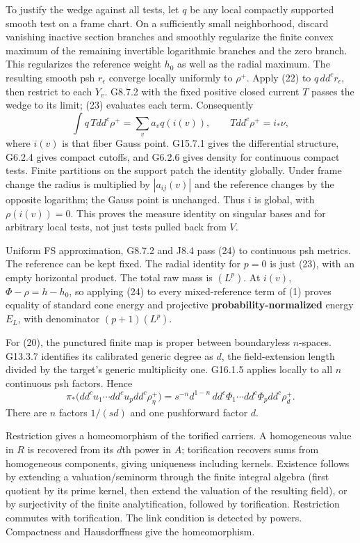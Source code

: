 \documentclass[
  10pt,
]{article}
\begin{document}
To justify the wedge against all tests, let \(q\) be any local compactly
supported smooth test on a frame chart. On a sufficiently small
neighborhood, discard vanishing inactive section branches and smoothly
regularize the finite convex maximum of the remaining invertible
logarithmic branches and the zero branch. This regularizes the reference
weight \(h_0\) as well as the radial maximum. The resulting smooth psh
\(r_\epsilon\) converge locally uniformly to \(\rho^+\). Apply (22) to
\(q\,dd^cr_\epsilon\), then restrict to each \(Y_v\). G8.7.2 with the
fixed positive closed current \(T\) passes the wedge to its limit; (23)
evaluates each term. Consequently
\[ \int q\,Tdd^c\rho^+=\sum_v a_vq(i(v)),\qquad Tdd^c\rho^+=i_*\nu,                            \tag{24}\]
where \(i(v)\) is that fiber Gauss point. G15.7.1 gives the differential
structure, G6.2.4 gives compact cutoffs, and G6.2.6 gives density for
continuous compact tests. Finite partitions on the support patch the
identity globally. Under frame change the radius is multiplied by
\(|a_{ij}(v)|\) and the reference changes by the opposite logarithm; the
Gauss point is unchanged. Thus \(i\) is global, with \(\rho(i(v))=0\).
This proves the measure identity on singular bases and for arbitrary
local tests, not just tests pulled back from \(V\).

Uniform FS approximation, G8.7.2 and J8.4 pass (24) to continuous psh
metrics. The reference can be kept fixed. The radial identity for
\(p=0\) is just (23), with an empty horizontal product. The total raw
mass is \((L^p)\). At \(i(v)\), \(\Phi-\rho=h-h_0\), so applying (24) to
every mixed-reference term of (1) proves equality of standard cone
energy and projective \textbf{probability-normalized} energy \(E_L\),
with denominator \((p+1)(L^p)\).

For (20), the punctured finite map is proper between boundaryless
\(n\)-spaces. G13.3.7 identifies its calibrated generic degree as \(d\),
the field-extension length divided by the target's generic multiplicity
one. G16.1.5 applies locally to all \(n\) continuous psh factors. Hence
\[ \pi_*\big(dd^cu_1\cdots dd^cu_pdd^c\rho_\eta^+\big)
       =s^{-n}d^{1-n}\,dd^c\Phi_1\cdots dd^c\Phi_pdd^c\rho_d^+.                              \tag{25}\]
There are \(n\) factors \(1/(sd)\) and one pushforward factor \(d\).

Restriction gives a homeomorphism of the torified carriers. A
homogeneous value in \(R\) is recovered from its \(d\)th power in \(A\);
torification recovers sums from homogeneous components, giving
uniqueness including kernels. Existence follows by extending a
valuation/seminorm through the finite integral algebra (first quotient
by its prime kernel, then extend the valuation of the resulting field),
or by surjectivity of the finite analytification, followed by
torification. Restriction commutes with torification. The link condition
is detected by powers. Compactness and Hausdorffness give the
homeomorphism.
\end{document}
